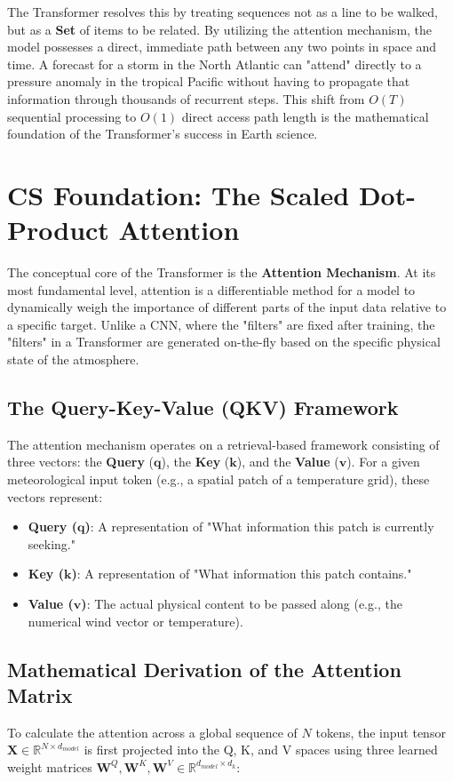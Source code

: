 The Transformer resolves this by treating sequences not as a line to be walked, but as a \textbf{Set} of items to be related. By utilizing the attention mechanism, the model possesses a direct, immediate path between any two points in space and time. A forecast for a storm in the North Atlantic can "attend" directly to a pressure anomaly in the tropical Pacific without having to propagate that information through thousands of recurrent steps. This shift from $O(T)$ sequential processing to $O(1)$ direct access path length is the mathematical foundation of the Transformer's success in Earth science.

\section{CS Foundation: The Scaled Dot-Product Attention}

The conceptual core of the Transformer is the \textbf{Attention Mechanism}. At its most fundamental level, attention is a differentiable method for a model to dynamically weigh the importance of different parts of the input data relative to a specific target. Unlike a CNN, where the "filters" are fixed after training, the "filters" in a Transformer are generated on-the-fly based on the specific physical state of the atmosphere.

\subsection{The Query-Key-Value (QKV) Framework}
The attention mechanism operates on a retrieval-based framework consisting of three vectors: the \textbf{Query} ($\mathbf{q}$), the \textbf{Key} ($\mathbf{k}$), and the \textbf{Value} ($\mathbf{v}$). For a given meteorological input token (e.g., a spatial patch of a temperature grid), these vectors represent:

\begin{itemize}
    \item \textbf{Query ($\mathbf{q}$)}: A representation of "What information this patch is currently seeking."
    \item \textbf{Key ($\mathbf{k}$)}: A representation of "What information this patch contains."
    \item \textbf{Value ($\mathbf{v}$)}: The actual physical content to be passed along (e.g., the numerical wind vector or temperature).
\end{itemize}

\subsection{Mathematical Derivation of the Attention Matrix}
To calculate the attention across a global sequence of $N$ tokens, the input tensor $\mathbf{X} \in \mathbb{R}^{N \times d_{model}}$ is first projected into the Q, K, and V spaces using three learned weight matrices $\mathbf{W}^Q, \mathbf{W}^K, \mathbf{W}^V \in \mathbb{R}^{d_{model} \times d_k}$:

